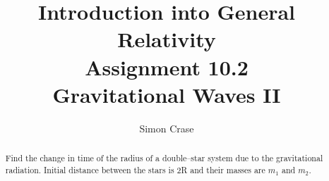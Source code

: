 \documentclass[]{article}
\title{Introduction into General Relativity\\Assignment 10.2\\Gravitational Waves II}
\author{Simon Crase}
\begin{document}
\maketitle

\begin{abstract}
Find the change in time of the radius of a double--star system due to the gravitational radiation. Initial distance between the stars is 2R and their masses are $m_1$ and $m_2$.
\end{abstract}

\section{}
\end{document}
